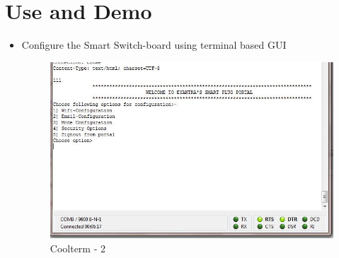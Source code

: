 \documentclass[a4paper,12pt,oneside]{book}
\begin{document}
\section{Use and Demo}
\begin{itemize}
	\item{Configure the Smart Switch-board using terminal based GUI }
	
	\begin{figure}[H]  \centering
		\includegraphics[width=13cm]{coolterm2.jpg}
		\caption{ Coolterm - 2}
		\label{34}
		

\end{figure}
\end{itemize}
\end{document}
